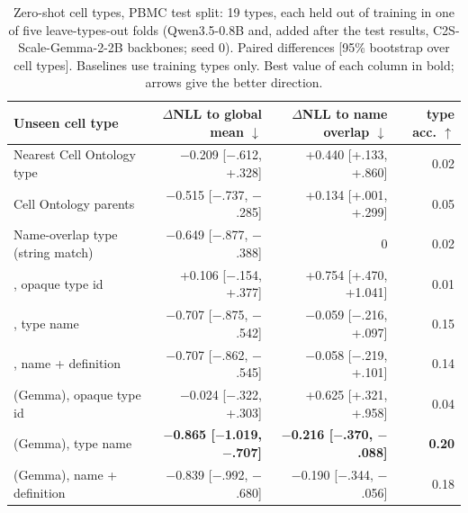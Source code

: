 \begin{table}[t]
\centering
\setlength{\tabcolsep}{4pt}
\begin{tabular}{lrrr}
\toprule
Unseen cell type & $\Delta$NLL to global mean $\downarrow$ & $\Delta$NLL to name overlap $\downarrow$ & type acc. $\uparrow$ \\
\midrule
Nearest Cell Ontology type & $-$0.209 [$-$.612, +.328] & +0.440 [+.133, +.860] & 0.02 \\
Cell Ontology parents & $-$0.515 [$-$.737, $-$.285] & +0.134 [+.001, +.299] & 0.05 \\
Name-overlap type (string match) & $-$0.649 [$-$.877, $-$.388] & 0 & 0.02 \\
\rowcolor{ours}\cad{}, opaque type id & +0.106 [$-$.154, +.377] & +0.754 [+.470, +1.041] & 0.01 \\
\rowcolor{ours}\cad{}, type name & $-$0.707 [$-$.875, $-$.542] & $-$0.059 [$-$.216, +.097] & 0.15 \\
\rowcolor{ours}\cad{}, name + definition & $-$0.707 [$-$.862, $-$.545] & $-$0.058 [$-$.219, +.101] & 0.14 \\
\rowcolor{ours}\cad{} (Gemma), opaque type id & $-$0.024 [$-$.322, +.303] & +0.625 [+.321, +.958] & 0.04 \\
\rowcolor{ours}\cad{} (Gemma), type name & \textbf{$-$0.865 [$-$1.019, $-$.707]} & \textbf{$-$0.216 [$-$.370, $-$.088]} & \textbf{0.20} \\
\rowcolor{ours}\cad{} (Gemma), name + definition & $-$0.839 [$-$.992, $-$.680] & $-$0.190 [$-$.344, $-$.056] & 0.18 \\
\bottomrule
\end{tabular}
\caption{Zero-shot cell types, PBMC test split: 19 types, each held out of training in one of five leave-types-out folds (Qwen3.5-0.8B and, added after the test results, C2S-Scale-Gemma-2-2B backbones; seed 0). Paired differences [95\% bootstrap over cell types]. Baselines use training types only. Best value of each column in bold; arrows give the better direction.}
\label{tab:zeroshot}
\end{table}
